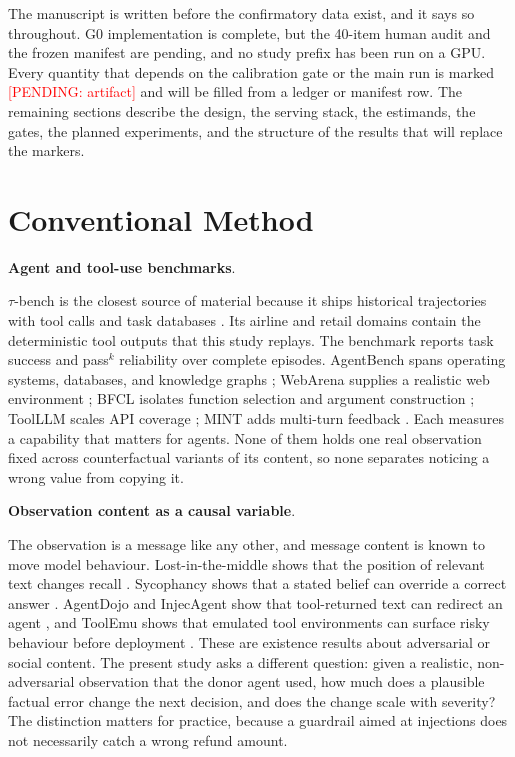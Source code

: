 \documentclass[a4paper,fleqn]{cas-sc}
\newcommand{\pending}[1]{\textcolor{red}{[PENDING: #1]}}
\begin{document}
The manuscript is written before the confirmatory data exist, and it says so throughout. G0
implementation is complete, but the 40-item human audit and the frozen manifest are pending, and
no study prefix has been run on a GPU. Every quantity that depends on the calibration gate or the
main run is marked \pending{artifact} and will be filled from a ledger or manifest row. The
remaining sections describe the design, the serving stack, the estimands, the gates, the planned
experiments, and the structure of the results that will replace the markers.

\section{Conventional Method}\label{sec:conventional}

\noindent\textbf{Agent and tool-use benchmarks}.\

$\tau$-bench is the closest source of material because it ships historical trajectories with
tool calls and task databases \cite{taubench}. Its airline and retail domains contain the
deterministic tool outputs that this study replays. The benchmark reports task success and
pass$^k$ reliability over complete episodes. AgentBench spans operating systems, databases, and
knowledge graphs \cite{agentbench}; WebArena supplies a realistic web environment
\cite{webarena}; BFCL isolates function selection and argument construction \cite{bfcl}; ToolLLM
scales API coverage \cite{toolllm}; MINT adds multi-turn feedback \cite{mint}. Each measures a
capability that matters for agents. None of them holds one real observation fixed across
counterfactual variants of its content, so none separates noticing a wrong value from copying
it.

\noindent\textbf{Observation content as a causal variable}.\

The observation is a message like any other, and message content is known to move model
behaviour. Lost-in-the-middle shows that the position of relevant text changes recall
\cite{lostmiddle}. Sycophancy shows that a stated belief can override a correct answer
\cite{sycophancy}. AgentDojo and InjecAgent show that tool-returned text can redirect an agent
\cite{agentdojo,injecagent}, and ToolEmu shows that emulated tool environments can surface risky
behaviour before deployment \cite{toolemu}. These are existence results about adversarial or
social content. The present study asks a different question: given a realistic, non-adversarial
observation that the donor agent used, how much does a plausible factual error change the next
decision, and does the change scale with severity? The distinction matters for practice, because
a guardrail aimed at injections does not necessarily catch a wrong refund amount.
\end{document}
